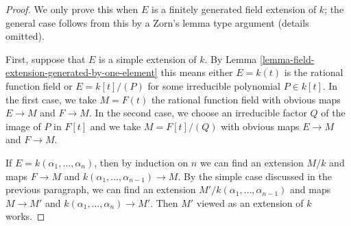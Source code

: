 \begin{proof}
We only prove this when $E$ is a finitely generated field extension
of $k$; the general case follows from this by a Zorn's lemma type argument
(details omitted).

\medskip\noindent
First, suppose that $E$ is a simple extension of $k$. By
Lemma \ref{lemma-field-extension-generated-by-one-element}
this means either $E = k(t)$ is the rational function field
or $E = k[t]/(P)$ for some irreducible polynomial $P \in k[t]$.
In the first case, we take $M = F(t)$ the rational function field
with obvious maps $E \to M$ and $F \to M$. In the second case, we
choose an irreducible factor $Q$ of the image of $P$ in $F[t]$
and we take $M = F[t]/(Q)$ with obvious maps $E \to M$ and $F \to M$.

\medskip\noindent
If $E = k(\alpha_1, \ldots, \alpha_n)$, then by induction on $n$
we can find an extension $M/k$ and maps $F \to M$ and
$k(\alpha_1, \ldots, \alpha_{n - 1}) \to M$. By the simple
case discussed in the previous paragraph,
we can find an extension $M'/k(\alpha_1, \ldots, \alpha_{n - 1})$
and maps $M \to M'$ and $k(\alpha_1, \ldots, \alpha_n) \to M'$.
Then $M'$ viewed as an extension of $k$ works.
\end{proof}



